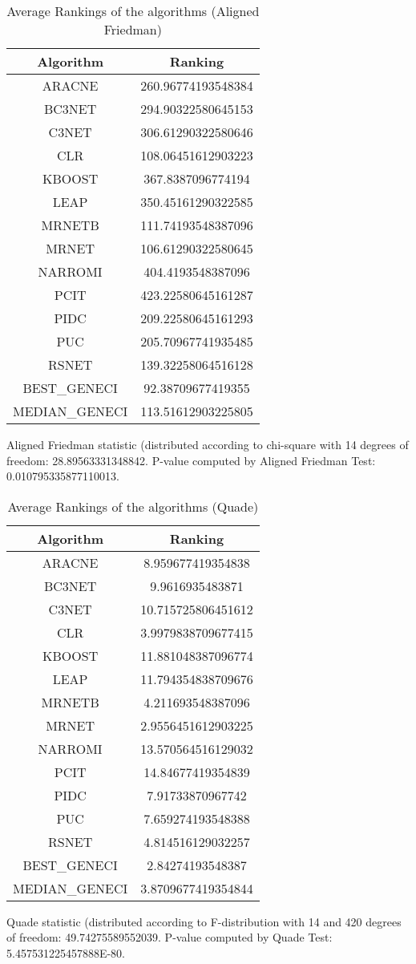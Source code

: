 \documentclass[a4paper,10pt]{article}
\begin{document}
\begin{landscape}
\begin{table}[!htp]
\centering
\caption{Average Rankings of the algorithms (Aligned Friedman)
}\begin{tabular}{c|c}
Algorithm&Ranking\\
\hline
ARACNE&260.96774193548384\\
BC3NET&294.90322580645153\\
C3NET&306.61290322580646\\
CLR&108.06451612903223\\
KBOOST&367.8387096774194\\
LEAP&350.45161290322585\\
MRNETB&111.74193548387096\\
MRNET&106.61290322580645\\
NARROMI&404.4193548387096\\
PCIT&423.22580645161287\\
PIDC&209.22580645161293\\
PUC&205.70967741935485\\
RSNET&139.32258064516128\\
BEST_GENECI&92.38709677419355\\
MEDIAN_GENECI&113.51612903225805\\
\end{tabular}
\end{table}


Aligned Friedman statistic (distributed according to chi-square with 14 degrees of freedom: 28.89563331348842. 
P-value computed by Aligned Friedman Test: 0.010795335877110013.\newline


\newpage

\begin{table}[!htp]
\centering
\caption{Average Rankings of the algorithms (Quade)
}\begin{tabular}{c|c}
Algorithm&Ranking\\
\hline
ARACNE&8.959677419354838\\
BC3NET&9.9616935483871\\
C3NET&10.715725806451612\\
CLR&3.9979838709677415\\
KBOOST&11.881048387096774\\
LEAP&11.794354838709676\\
MRNETB&4.211693548387096\\
MRNET&2.9556451612903225\\
NARROMI&13.570564516129032\\
PCIT&14.84677419354839\\
PIDC&7.91733870967742\\
PUC&7.659274193548388\\
RSNET&4.814516129032257\\
BEST_GENECI&2.84274193548387\\
MEDIAN_GENECI&3.8709677419354844\\
\end{tabular}
\end{table}
Quade statistic (distributed according to F-distribution with 14 and 420 degrees of freedom: 49.74275589552039. 
P-value computed by Quade Test: 5.457531225457888E-80.\newline



\end{landscape}
\end{document}
